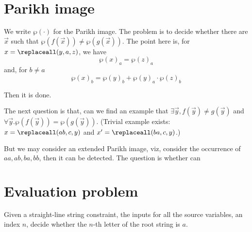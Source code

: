  


\section{Parikh image}

We write $\wp(\cdot)$ for the Parikh image. The problem is to decide whether there are $\vec{x}$ such that $\wp(f(\vec{x})) \neq \wp(g(\vec{x}))$. The point here is, for $x=\replaceall(y, a,z)$, we have 
\[\wp(x)_a =  \wp(z)_a\]
and, for $b\neq a$
\[\wp(x)_b =  \wp(y)_b+ \wp(y)_a\cdot \wp(z)_b\]

Then it is done. 

The next question is that, can we find an example that $\exists \vec{y}, f(\vec{y})\neq g(\vec{y})$ and $\forall \vec{y}. \wp(f(\vec{y})) = \wp(g(\vec{y}))$. (Trivial example exists: $x=\replaceall(ab,c,y)$ and $x'=\replaceall(ba,c,y)$.)

But we may consider an extended Parikh image, viz, consider the occurrence of $aa, ab, ba, bb$, then it can be detected. The question is whether can %

\section{Evaluation problem}

Given a straight-line string constraint, the inputs for all the source variables, an index $n$, decide whether the $n$-th letter of the root string is $a$. 